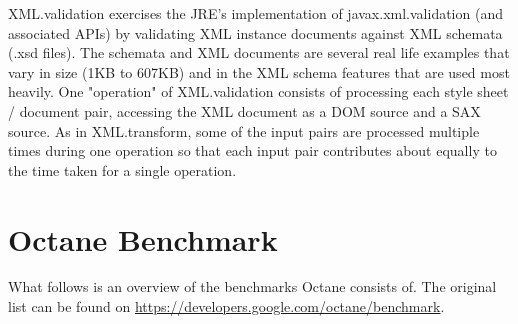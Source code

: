 \begin{itemize}
XML.validation exercises the JRE's implementation of javax.xml.validation (and associated APIs) by validating XML instance documents against XML schemata (.xsd files). The schemata and XML documents are several real life examples that vary in size (1KB to 607KB) and in the XML schema features that are used most heavily. One "operation" of XML.validation consists of processing each style sheet / document pair, accessing the XML document as a DOM source and a SAX source. As in XML.transform, some of the input pairs are processed multiple times during one operation so that each input pair contributes about equally to the time taken for a single operation. 
\end{itemize}

\section{Octane Benchmark}
\label{a:octane_benchmark}
What follows is an overview of the benchmarks Octane consists of.
The original list can be found on \url{https://developers.google.com/octane/benchmark}.
